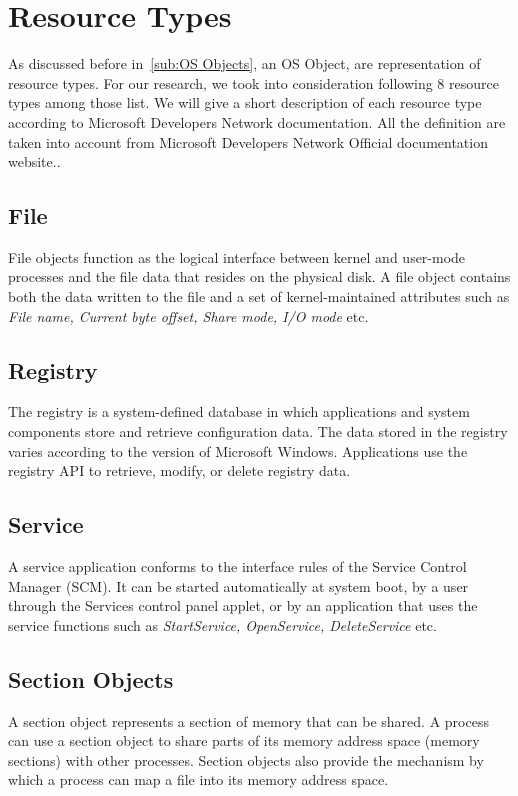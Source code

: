 \section{Resource Types}
\label{sec:Resource Types}
As discussed before in~\autoref{sub:OS Objects}, an OS Object, are representation of resource types.
For our research, we took into consideration following 8 resource types among those list.
We will give a short description of each resource type according to Microsoft Developers Network documentation.
All the definition are taken into account from Microsoft Developers Network Official documentation website.\cite[MSDN]{msdn}.
\subsection{File}
\label{sub:File}
File objects function as the logical interface between kernel and user-mode processes and the file data that resides on the physical disk.
A file object contains both the data written to the file and a set of kernel-maintained attributes such as \emph{File name, Current byte offset, Share mode, I/O mode} etc.
\subsection{Registry}
\label{sub:Registry}
The registry is a system-defined database in which applications and system components store and retrieve configuration data.
The data stored in the registry varies according to the version of Microsoft Windows.
Applications use the registry API to retrieve, modify, or delete registry data.
\subsection{Service}
\label{sub:Service}
A service application conforms to the interface rules of the Service Control Manager (SCM).
It can be started automatically at system boot, by a user through the Services control panel applet, or by an application that uses the service functions such as \emph{StartService, OpenService, DeleteService} etc.
\subsection{Section Objects}
\label{sub:Section Objects}
A section object represents a section of memory that can be shared.
A process can use a section object to share parts of its memory address space (memory sections) with other processes.
Section objects also provide the mechanism by which a process can map a file into its memory address space.

